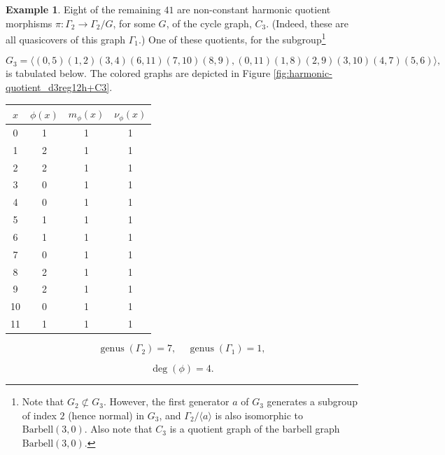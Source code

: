 \documentclass[12pt,letterpaper]{article}
\theoremstyle{definition}
\newtheorem{example}[theorem]{Example}
\DeclareMathOperator{\genus}{genus}
\begin{document}
\begin{example}
{Eight of the remaining $41$ are non-constant harmonic quotient
morphisms $\pi: \Gamma_2\to \Gamma_2/G$, for some $G$, of the
cycle graph, $C_3$.
(Indeed, these are all quasicovers of this graph $\Gamma_1$.)
One of these quotients, for the subgroup\footnote{Note that $G_2\not\subset G_3$. However, the first generator $a$ of $G_3$ generates a subgroup of index $2$ (hence normal) in $G_3$, and $\Gamma_2/\langle a\rangle$ is also isomorphic to $\mathrm{Barbell}(3,0)$. Also note that $C_3$ is a quotient graph of the barbell
graph $\mathrm{Barbell}(3,0)$.}

\[
G_3=\langle (0,5)(1,2)(3,4)(6,11)(7,10)(8,9), (0,11)(1,8)(2,9)(3,10)(4,7)(5,6) \rangle,
\]
is tabulated below. The colored graphs are depicted in
Figure \ref{fig:harmonic-quotient_d3reg12h+C3}.

\begin{center}
\begin{tabular}{c|c|c|c}  
  $x$ & $\phi(x)$ & $m_\phi(x)$ & $\nu_\phi(x)$ \\ \hline
  0   &    1   &        1         &  1   \\ 
  1   &    2   &        1         &  1   \\ 
  2   &    2   &        1         &  1   \\ 
  3   &    0   &        1         &  1   \\ 
  4   &    0   &        1         &  1   \\ 
  5   &    1   &        1         &  1    \\ 
  6   &    1   &        1         &  1   \\ 
  7   &    0   &        1         &  1   \\
  8   &    2   &        1         &  1   \\
  9   &    2   &        1         &  1   \\
  10  &    0   &        1         &  1   \\
  11  &    1   &        1         &  1   \\ 
\end{tabular}
\end{center}

\[
  \genus(\Gamma_2) =7,\ \ \ \ \
  \genus(\Gamma_1) =1,
\]

\[
\deg(\phi) =4.
\]

}
\end{example}
\end{document}
